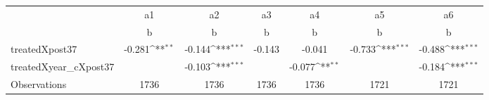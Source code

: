{
\def\sym#1{\ifmmode^{#1}\else\(^{#1}\)\fi}
\begin{tabular}{l*{6}{c}}
\toprule
                    &          a1         &          a2         &          a3         &          a4         &          a5         &          a6         \\
                    &           b         &           b         &           b         &           b         &           b         &           b         \\
\midrule
treatedXpost37      &      -0.281\sym{**} &      -0.144\sym{***}&      -0.143         &      -0.041         &      -0.733\sym{***}&      -0.488\sym{***}\\
treatedXyear\_cXpost37&                     &      -0.103\sym{***}&                     &      -0.077\sym{**} &                     &      -0.184\sym{***}\\
\midrule
Observations        &        1736         &        1736         &        1736         &        1736         &        1721         &        1721         \\
\bottomrule
\end{tabular}
}
